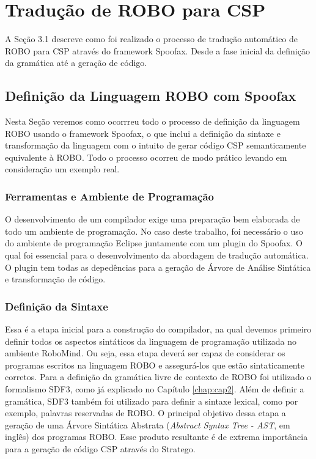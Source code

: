 \chapter{Tradução de ROBO para CSP}
\label{chap:cap3}
A Seção 3.1 descreve como foi realizado o processo de tradução automático de ROBO para CSP através do framework Spoofax. Desde a fase inicial da definição da gramática até a geração de código.

\section{Definição da Linguagem ROBO com Spoofax}
Nesta Seção veremos como ocorrreu todo o processo de definição da linguagem ROBO usando o framework Spoofax, o que inclui a definição da sintaxe e transformação da linguagem com o intuito de gerar código CSP semanticamente equivalente à ROBO. Todo o processo ocorreu de modo prático levando em consideração um exemplo real.

\subsection{Ferramentas e Ambiente de Programação}
O desenvolvimento de um compilador exige uma preparação bem elaborada de todo um ambiente de programação. No caso deste trabalho, foi necessário o uso do ambiente de programação Eclipse juntamente com um plugin do Spoofax. O qual foi essencial para o desenvolvimento da abordagem de tradução automática. O plugin tem todas as depedências para a geração de Árvore de Análise Sintática e transformação de código.

\subsection{Definição da Sintaxe}
Essa é a etapa inicial para a construção do compilador, na qual devemos primeiro definir todos os aspectos sintáticos da linguagem de programação utilizada no ambiente RoboMind. Ou seja, essa etapa deverá ser capaz de considerar os programas escritos na linguagem ROBO e assegurá-los que estão sintaticamente corretos. Para a definição da gramática livre de contexto de ROBO foi utilizado o formalismo SDF3, como já explicado no Capítulo \ref{chap:cap2}. Além de definir a gramática, SDF3 também foi utilizado para definir a sintaxe lexical, como por exemplo, palavras reservadas de ROBO. O principal objetivo dessa etapa a geração de uma Árvore Sintática Abstrata (\textit{Abstract Syntax Tree - AST}, em inglês) dos programas ROBO. Esse produto resultante é de extrema importância para a geração de código CSP através do Stratego.

